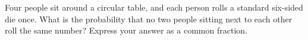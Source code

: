 Four people sit around a circular table, and each person rolls a standard six-sided die once. What is the probability that no two people sitting next to each other roll the same number? Express your answer as a common fraction.
